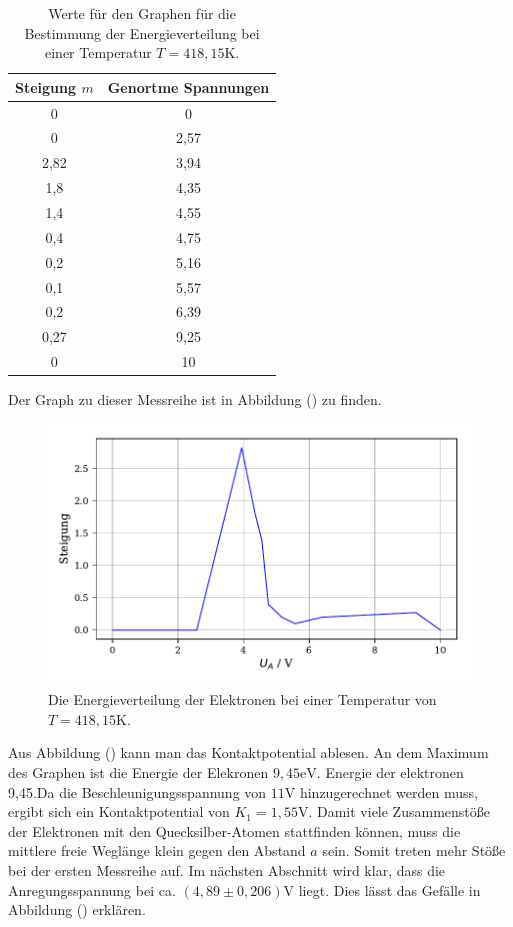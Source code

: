 \begin{table}[H]
  \centering
  \caption{Werte für den Graphen für die Bestimmung der Energieverteilung bei einer Temperatur $T=418,15$K.}
  \label{tab:Parameter}
  \begin{tabular}{c c}
    \toprule
    Steigung $m$ &  Genortme Spannungen \\
    \bottomrule
    0 & 0\\
    0 & 2,57\\
    2,82 & 3,94\\
    1,8 &4,35\\
    1,4 &4,55\\
    0,4 &4,75\\
    0,2 &5,16\\
    0,1 &5,57\\
    0,2&6,39\\
    0,27 &9,25\\
    0 &10\\
  
    \bottomrule
  \end{tabular}
\end{table}

Der Graph zu dieser Messreihe ist in Abbildung () zu finden.

\begin{figure}[H]
  \centering
  \includegraphics{plota2.pdf}
  \caption{Die Energieverteilung der Elektronen bei einer Temperatur von $T=418,15$K.}
  \label{fig:plot}
\end{figure}

\noindent Aus Abbildung () kann man das Kontaktpotential ablesen. 
An dem Maximum des Graphen ist die Energie der Elekronen $9,45\si{\eV}$.
Energie der elektronen 9,45.Da die Beschleunigungsspannung von $11\si{\V}$ hinzugerechnet werden muss, ergibt sich
ein Kontaktpotential von $K_1 = 1,55 \si{\V}$.
Damit viele Zusammenstöße der Elektronen mit den Quecksilber-Atomen stattfinden können, muss die mittlere freie Weglänge klein gegen den Abstand $a$ sein.
Somit treten mehr Stöße bei der ersten Messreihe auf.
Im nächsten Abschnitt wird klar, dass die Anregungsspannung bei ca. $ (4,89 \pm 0,206) \si{\V}$ liegt. Dies lässt das Gefälle in Abbildung () erklären.

